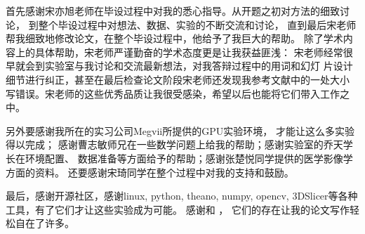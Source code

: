 
\begin{ack}
    首先感谢宋亦旭老师在毕设过程中对我的悉心指导。从开题之初对方法的细致讨论，
    到整个毕设过程中对想法、数据、实验的不断交流和讨论，
    直到最后宋老师帮我细致地修改论文，在整个毕设过程中，他给予了我巨大的帮助。
    除了学术内容上的具体帮助，宋老师严谨勤奋的学术态度更是让我获益匪浅：
    宋老师经常很早就会到实验室与我讨论和交流最新想法，对我答辩过程中的用词和幻灯
    片设计细节进行纠正，甚至在最后检查论文阶段宋老师还发现我参考文献中的一处大小
    写错误。宋老师的这些优秀品质让我很受感染，希望以后也能将它们带入工作之中。

    另外要感谢我所在的实习公司Megvii所提供的GPU实验环境，
    才能让这么多实验得以完成；
    感谢曹志敏师兄在一些数学问题上给我的帮助；感谢实验室的乔天学长在环境配置、
    数据准备等方面给予的帮助；感谢张楚悦同学提供的医学影像学方面的资料。
    还要感谢宋琦同学在整个过程中对我的支持和鼓励。

    最后，感谢开源社区，感谢linux, python, theano, numpy,
    opencv, 3DSlicer等各种工具，有了它们才让这些实验成为可能。
    感谢\XeLaTeX 和 \thuthesis， 它们的存在让我的论文写作轻松自在了许多。
\end{ack}
